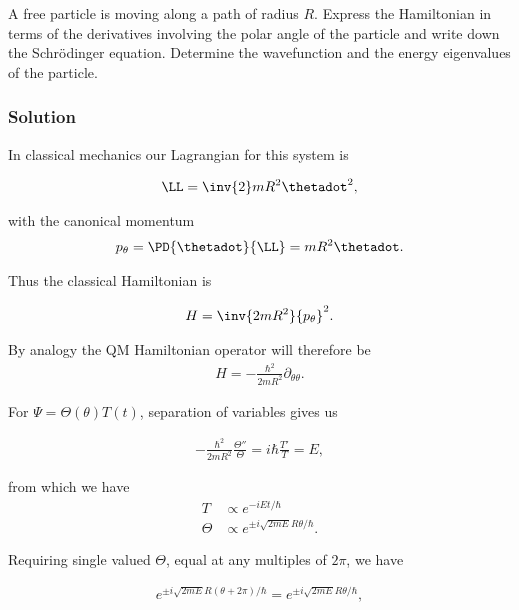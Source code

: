 A free particle is moving along a path of radius $R$.  Express the Hamiltonian in terms of the derivatives involving the polar angle of the particle and write down the Schr\"{o}dinger equation.  Determine the wavefunction and the energy eigenvalues of the particle.

\subsubsection{Solution}

In classical mechanics our Lagrangian for this system is

\begin{align}\label{eqn:desaiCh4:500}
\LL = \inv{2} m R^2 \thetadot^2,
\end{align}

with the canonical momentum
\begin{align}\label{eqn:desaiCh4:501}
p_\theta = \PD{\thetadot}{\LL} = m R^2 \thetadot.
\end{align}

Thus the classical Hamiltonian is

\begin{align}\label{eqn:desaiCh4:502}
H = \inv{2m R^2} {p_\theta}^2.
\end{align}

By analogy the QM Hamiltonian operator will therefore be
\begin{align}\label{eqn:desaiCh4:503}
H = -\frac{\hbar^2}{2m R^2} \partial_{\theta\theta}.
\end{align}

For $\Psi = \Theta(\theta) T(t)$, separation of variables gives us

\begin{align}\label{eqn:desaiCh4:n}
-\frac{\hbar^2}{2m R^2} \frac{\Theta''}{\Theta} = i \hbar \frac{T'}{T} = E,
\end{align}

from which we have
\begin{align}\label{eqn:desaiCh4:504}
T &\propto e^{-i E t/\hbar} \\
\Theta &\propto e^{ \pm i \sqrt{2m E} R \theta/\hbar }.
\end{align}

Requiring single valued $\Theta$, equal at any multiples of $2\pi$, we have

\begin{align*}
e^{ \pm i \sqrt{2m E} R (\theta + 2\pi)/\hbar } = e^{ \pm i \sqrt{2m E} R \theta/\hbar },
\end{align*}

